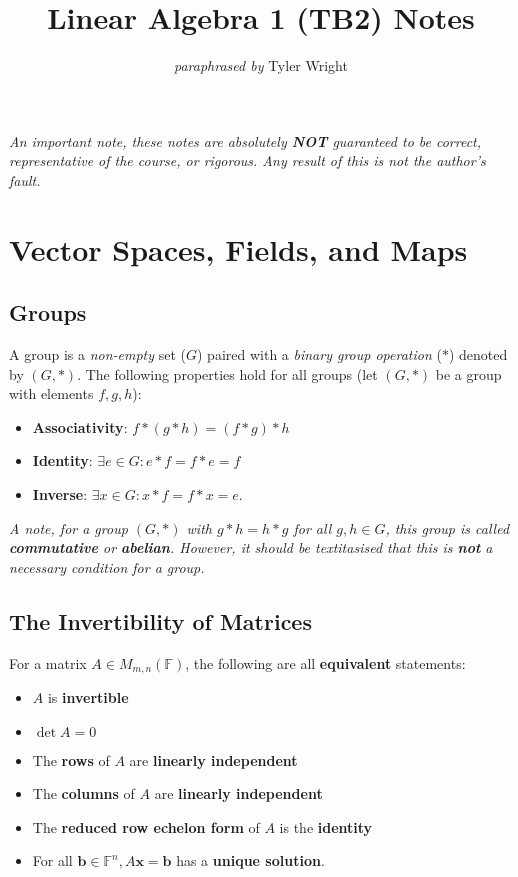 \documentclass[a4paper, 12pt, twoside]{article}
\begin{document}
\title{Linear Algebra 1 (TB2) Notes}
\date{}
\author{\textit{paraphrased by} Tyler Wright}
\maketitle

\vfill

\textit{An important note, these notes are absolutely \textbf{NOT}
  guaranteed to be correct, representative of the course, or rigorous.
  Any result of this is not the author's fault.}

\newpage

\section{Vector Spaces, Fields, and Maps}

\subsection{Groups}

A group is a \textit{non-empty} set ($G$) paired with a
\textit{binary group operation} ($*$) denoted by $(G, *)$.
The following properties hold for all groups (let $(G, *)$
be a group with elements $f, g, h$):

\begin{itemize}
  \item \textbf{Associativity}: $f * (g * h) = (f * g) * h$
  \item \textbf{Identity}: $\exists e \in G : e * f = f * e = f$
  \item \textbf{Inverse}: $\exists x \in G : x * f = f * x = e$.
\end{itemize}

\textit{A note, for a group $(G, *)$ with $g * h = h * g$ for all $g, h \in G$,
  this group is called \textbf{commutative} or \textbf{abelian}. However, it
  should be textitasised that this is \textbf{not} a necessary condition for
  a group.}

\subsection{The Invertibility of Matrices}

For a matrix $A \in M_{m, n}( \mathbb{F} )$, the following are all
\textbf{equivalent} statements:

\begin{itemize}
  \item $A$ is \textbf{invertible}
  \item $\det{A} = 0$
  \item The \textbf{rows} of $A$ are \textbf{linearly independent}
  \item The \textbf{columns} of $A$ are \textbf{linearly independent}
  \item The \textbf{reduced row echelon form} of $A$ is the \textbf{identity}
  \item For all $\textbf{b} \in \mathbb{F}^n, A\textbf{x} = \textbf{b}$ has
        a \textbf{unique solution}.
\end{itemize}
\end{document}
